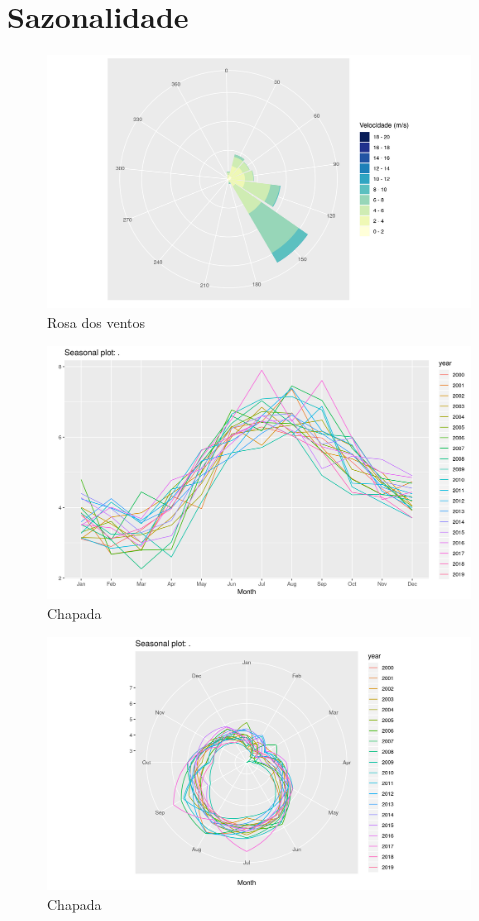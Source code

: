 \documentclass[
	12pt,				%
	openright,			%
	oneside,			%
	a4paper,			%
	english,			%
	french,				%
	spanish,			%
	brazil				%
	]{abntex2}
\begin{document}
\section{Sazonalidade}

\begin{figure}[h]
    \centering
	\includegraphics[width=\textwidth]{windrose}
	\caption{Rosa dos ventos}
\end{figure}
\FloatBarrier

\begin{figure}[h]
    \centering
	\includegraphics[width=\textwidth]{season_plot}
	\caption{Chapada}
\end{figure}
\FloatBarrier

\begin{figure}[h]
    \centering
	\includegraphics[width=\textwidth]{season_plot_polar}
	\caption{Chapada}
\end{figure}
\FloatBarrier
\end{document}
